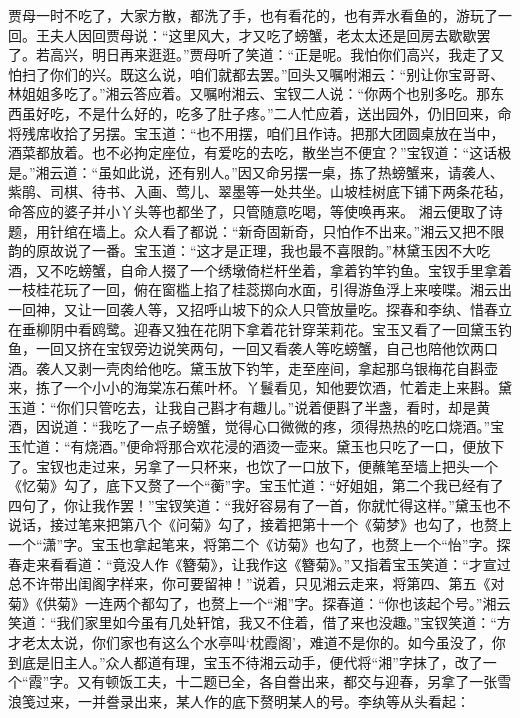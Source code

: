 \documentclass[12pt,oneside]{book}
\begin{document}
贾母一时不吃了，大家方散，都洗了手，也有看花的，也有弄水看鱼的，游玩了一回。王夫人因回贾母说：“这里风大，才又吃了螃蟹，老太太还是回房去歇歇罢了。若高兴，明日再来逛逛。”贾母听了笑道：“正是呢。我怕你们高兴，我走了又怕扫了你们的兴。既这么说，咱们就都去罢。”回头又嘱咐湘云：“别让你宝哥哥、林姐姐多吃了。”湘云答应着。又嘱咐湘云、宝钗二人说：“你两个也别多吃。那东西虽好吃，不是什么好的，吃多了肚子疼。”二人忙应着，送出园外，仍旧回来，命将残席收拾了另摆。宝玉道：“也不用摆，咱们且作诗。把那大团圆桌放在当中，酒菜都放着。也不必拘定座位，有爱吃的去吃，散坐岂不便宜？”宝钗道：“这话极是。”湘云道：“虽如此说，还有别人。”因又命另摆一桌，拣了热螃蟹来，请袭人、紫鹃、司棋、待书、入画、莺儿、翠墨等一处共坐。山坡桂树底下铺下两条花毡，命答应的婆子并小丫头等也都坐了，只管随意吃喝，等使唤再来。
湘云便取了诗题，用针绾在墙上。众人看了都说：“新奇固新奇，只怕作不出来。”湘云又把不限韵的原故说了一番。宝玉道：“这才是正理，我也最不喜限韵。”林黛玉因不大吃酒，又不吃螃蟹，自命人掇了一个绣墩倚栏杆坐着，拿着钓竿钓鱼。宝钗手里拿着一枝桂花玩了一回，俯在窗槛上掐了桂蕊掷向水面，引得游鱼浮上来唼喋。湘云出一回神，又让一回袭人等，又招呼山坡下的众人只管放量吃。探春和李纨、惜春立在垂柳阴中看鸥鹭。迎春又独在花阴下拿着花针穿茉莉花。宝玉又看了一回黛玉钓鱼，一回又挤在宝钗旁边说笑两句，一回又看袭人等吃螃蟹，自己也陪他饮两口酒。袭人又剥一壳肉给他吃。黛玉放下钓竿，走至座间，拿起那乌银梅花自斟壶来，拣了一个小小的海棠冻石蕉叶杯。丫鬟看见，知他要饮酒，忙着走上来斟。黛玉道：“你们只管吃去，让我自己斟才有趣儿。”说着便斟了半盏，看时，却是黄酒，因说道：“我吃了一点子螃蟹，觉得心口微微的疼，须得热热的吃口烧酒。”宝玉忙道：“有烧酒。”便命将那合欢花浸的酒烫一壶来。黛玉也只吃了一口，便放下了。宝钗也走过来，另拿了一只杯来，也饮了一口放下，便蘸笔至墙上把头一个《忆菊》勾了，底下又赘了一个“蘅”字。宝玉忙道：“好姐姐，第二个我已经有了四句了，你让我作罢！”宝钗笑道：“我好容易有了一首，你就忙得这样。”黛玉也不说话，接过笔来把第八个《问菊》勾了，接着把第十一个《菊梦》也勾了，也赘上一个“潇”字。宝玉也拿起笔来，将第二个《访菊》也勾了，也赘上一个“怡”字。探春走来看看道：“竟没人作《簪菊》，让我作这《簪菊》。”又指着宝玉笑道：“才宣过总不许带出闺阁字样来，你可要留神！”说着，只见湘云走来，将第四、第五《对菊》《供菊》一连两个都勾了，也赘上一个“湘”字。探春道：“你也该起个号。”湘云笑道︰“我们家里如今虽有几处轩馆，我又不住着，借了来也没趣。”宝钗笑道：“方才老太太说，你们家也有这么个水亭叫‘枕霞阁’，难道不是你的。如今虽没了，你到底是旧主人。”众人都道有理，宝玉不待湘云动手，便代将“湘”字抹了，改了一个“霞”字。又有顿饭工夫，十二题已全，各自誊出来，都交与迎春，另拿了一张雪浪笺过来，一并誊录出来，某人作的底下赘明某人的号。李纨等从头看起：
\end{document}
